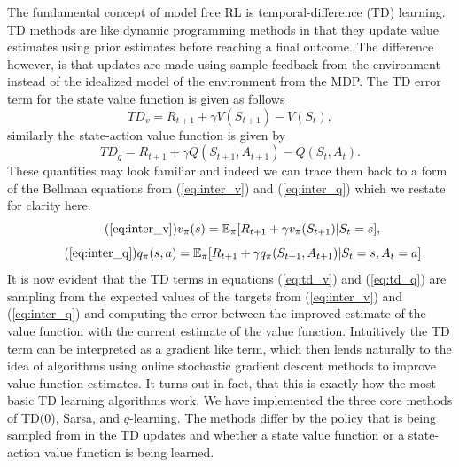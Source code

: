 \documentclass{article}
\newcommand{\mb}{\mathbb}
\begin{document}
The fundamental concept of model free RL is temporal-difference (TD) learning. TD methods are like dynamic programming methods in that they update value estimates using prior estimates before reaching a final outcome. The difference however, is that updates are made using sample feedback from the environment instead of the idealized model of the environment from the MDP. The TD error term for the state value function is given as follows
\begin{equation}\label{eq:td_v}
TD_v = R_{t+1} + \gamma V(S_{t+1}) - V(S_t),
\end{equation}
similarly the state-action value function is given by
\begin{equation}\label{eq:td_q}
TD_q = R_{t+1} + \gamma Q(S_{t+1}, A_{t+1}) - Q(S_t, A_t).
\end{equation}
These quantities may look familiar and indeed we can trace them back to a form of the Bellman equations from (\ref{eq:inter_v}) and (\ref{eq:inter_q}) which we restate for clarity here.
\begin{equation}\tag{\ref{eq:inter_v}}
v_\pi(s) = \mb{E}_\pi[R_{t+1} + \gamma v_\pi(S_{t+1})|S_t=s], 
\end{equation}
\begin{equation}\tag{\ref{eq:inter_q}}
q_\pi(s, a) = \mb{E}_\pi[R_{t+1} + \gamma q_\pi(S_{t+1}, A_{t+1})|S_t=s, A_t=a]
\end{equation}
It is now evident that the TD terms in equations (\ref{eq:td_v}) and (\ref{eq:td_q}) are sampling from the expected values of the targets from (\ref{eq:inter_v}) and (\ref{eq:inter_q}) and computing the error between the improved estimate of the value function with the current estimate of the value function. Intuitively the TD term can be interpreted as a gradient like term, which then lends naturally to the idea of algorithms using online stochastic gradient descent methods to improve value function estimates. It turns out in fact, that this is exactly how the most basic TD learning algorithms work. We have implemented the three core methods of TD(0), Sarsa, and $q$-learning. The methods differ by the policy that is being sampled from in the TD updates and whether a state value function or a state-action value function is being learned. 
\end{document}
